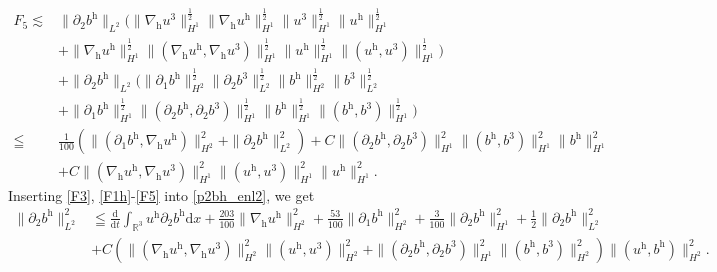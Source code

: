 \documentclass[11pt]{amsart}
\theoremstyle{definition}
\newcommand{\R}{\mathbb{R}}
\newcommand{\h}{\mathrm{h}}
\newcommand{\nablah}{\nabla_{\mathrm{h}}}
\numberwithin{equation}{section}
\begin{document}
\begin{align}\label{F5}
	F_5\lesssim& \|\partial_2 b^\h\|_{L^2}\Big(\|\nablah u^3\|_{H^1} ^\frac12\|\nablah u^\h\|_{H^1} ^\frac12\| u^3\|_{H^1} ^\frac12\| u^\h\|_{H^1} ^\frac12\nonumber\\
	&+\|\nablah u^\h\|_{H^1} ^\frac12\|(\nablah u^\h,\nablah u^3)\|_{H^1} ^\frac12\| u^\h\|_{H^1} ^\frac12\| (u^\h,u^3)\|_{H^1} ^\frac12\Big)\nonumber\\
	&+\|\partial_2 b^\h\|_{L^2}\Big(\|\partial_1b^\h\|_{H^2} ^\frac12\|\partial_2b^3\|_{L^2} ^\frac12\| b^\h\|_{H^2} ^\frac12\| b^3\|_{L^2} ^\frac12\nonumber\\
	&+\|\partial_1b^\h\|_{H^1} ^\frac12\|(\partial_2b^\h,\partial_2b^3)\|_{H^1} ^\frac12\| b^\h\|_{H^1} ^\frac12\| (b^\h,b^3)\|_{H^1} ^\frac12\Big)\nonumber\\
	\leqq &\frac{1}{100}\left(\|(\partial_1b^\h,\nablah u^\h)\|_{H^2}^2+\|\partial_2 b^\h\|_{L^2}^2\right)+C\|(\partial_2b^\h,\partial_2b^3)\|_{H^1} ^2\| (b^\h,b^3)\|_{H^1} ^2\| b^\h\|_{H^1} ^2\nonumber\\
	&+C\|(\nablah u^\h,\nablah u^3)\|_{H^1} ^2\| (u^\h,u^3)\|_{H^1} ^2\| u^\h\|_{H^1} ^2.
\end{align}
Inserting \eqref{F3}, \eqref{F1h}-\eqref{F5} into \eqref{p2bh_enl2}, we get
\begin{align}\label{Esti.p2bhL2}
	\|\partial_2b^\h\|_{L^2}^2&\leqq\frac{\mathrm{d}}{\mathrm{d} t}\int_{\R^3} u^\h\partial_2 b^\h\mathrm{d} x+\frac{203}{100}\|\nablah u^\h\|_{H^2}^2+\frac{53}{100}\|\partial_1 b^\h\|_{H^2}^2+\frac{3}{100}\|\partial_2 b^\h\|_{H^1}^2+\frac12\|\partial_2 b^\h\|_{L^2}^2\nonumber\\
	&+C\left(\|(\nablah u^\h,\nablah u^3)\|_{H^2}^2\|( u^\h, u^3)\|_{H^2}^2+\|(\partial_2 b^\h,\partial_2 b^3)\|_{H^1}^2\|( b^\h, b^3)\|_{H^2}^2\right)\| (u^\h,b^\h)\|_{H^2}^2.
\end{align}
\end{document}
